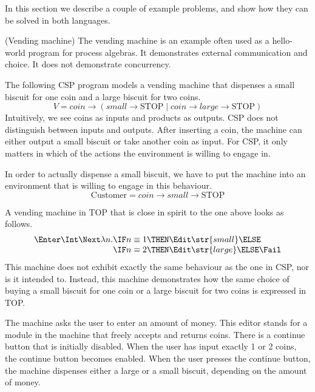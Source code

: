In this section we describe a couple of example problems, and show how they can be solved in both languages.


\begin{example}(Vending machine)
The vending machine is an example often used as a hello-world program for process algebras.
It demonstrates external communication and choice.
It does not demonstrate concurrency.

The following CSP program models a vending machine that dispenses a small biscuit for one coin and a large biscuit for two coins. $$V = \textit{coin} \to (\textit{small} \to \text{STOP} \mid \textit{coin} \to \textit{large} \to \text{STOP})$$
Intuitively, we see coins as inputs and products as outputs.
CSP does not distinguish between inputs and outputs.
After inserting a coin, the machine can either output a small biscuit or take another coin as input.
For CSP, it only matters in which of the actions the environment is willing to engage in.

In order to actually dispense a small biscuit, we have to put the machine into an environment that is willing to engage in this behaviour. $$\text{Customer} = \textit{coin} \to \textit{small} \to \text{STOP}$$

A vending machine in TOP that is close in spirit to the one above looks as follows.
\begin{equation*}
  \begin{array}{l @{} l}
    \Enter \Int \Next \lambda n. &
          \IF n \equiv 1 \THEN \Edit \str{small} \ELSE \\
        & \IF n \equiv 2 \THEN \Edit \str{large} \ELSE \Fail
  \end{array}
\end{equation*}
This machine does not exhibit exactly the same behaviour as the one in CSP, nor is it intended to.
Instead, this machine demonstrates how the same choice of buying a small biscuit for one coin or a large biscuit for two coins is expressed in TOP.

The machine asks the user to enter an amount of money.
This editor stands for a module in the machine that freely accepts and returns coins.
There is a continue button that is initially disabled.
When the user has input exactly 1 or 2 coins, the continue button becomes enabled.
When the user presses the continue button, the machine dispenses either a large or a small biscuit, depending on the amount of money.

\end{example}


